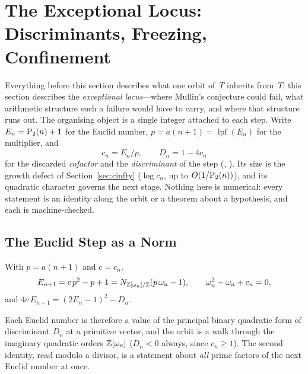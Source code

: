 \section{The Exceptional Locus: Discriminants, Freezing, Confinement}
\label{sec:exceptional}

Everything before this section describes what one orbit of~$T$ inherits
from~$T$; this section describes the \emph{exceptional locus}---where
Mullin's conjecture could fail, what arithmetic structure such a failure
would have to carry, and where that structure runs out.  The organising
object is a single integer attached to each step.  Write
$E_n = \mathrm{P}_{2}(n)+1$ for the Euclid number, $p = a(n{+}1) =
\operatorname{lpf}(E_n)$ for the multiplier, and
\[
  c_n = E_n / p, \qquad D_n = 1 - 4c_n
\]
for the discarded \emph{cofactor} and the \emph{discriminant} of the step
(,
).  Its size is the growth
defect of Section~\ref{sec:cinfty} ($\log c_n$, up to $O(1/\mathrm{P}_{2}(n))$),
and its quadratic character governs the next stage.  Nothing here is
numerical: every statement is an identity along the orbit or a theorem
about a hypothesis, and each is machine-checked.

\subsection{The Euclid Step as a Norm}
\label{sec:quadratic-step}

\begin{theorem}
\label{thm:norm-identity}
With $p = a(n{+}1)$ and $c = c_n$,
\[
  E_{n+1} = c\,p^{2} - p + 1 = N_{\mathbb{Z}[\omega_n]/\mathbb{Z}}(p\,\omega_n - 1),
  \qquad \omega_n^2 - \omega_n + c_n = 0,
\]
and $4c\,E_{n+1} = (2E_n - 1)^2 - D_n$.
\end{theorem}

Each Euclid number is therefore a value of the principal binary quadratic
form of discriminant $D_n$ at a primitive vector, and the orbit is a walk
through the imaginary quadratic orders $\mathbb{Z}[\omega_n]$ ($D_n < 0$ always,
since $c_n \geq 1$).  The second identity, read modulo a divisor, is a
statement about \emph{all} prime factors of the next Euclid number at once.

